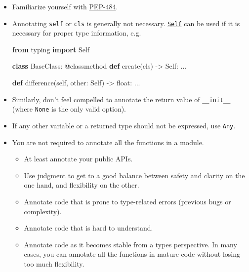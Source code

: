 \documentclass[
]{article}
\newenvironment{Shaded}{}{}
\newcommand{\AttributeTok}[1]{\textcolor[rgb]{0.49,0.56,0.16}{#1}}
\newcommand{\BuiltInTok}[1]{\textcolor[rgb]{0.00,0.50,0.00}{#1}}
\newcommand{\ImportTok}[1]{\textcolor[rgb]{0.00,0.50,0.00}{\textbf{#1}}}
\newcommand{\KeywordTok}[1]{\textcolor[rgb]{0.00,0.44,0.13}{\textbf{#1}}}
\newcommand{\NormalTok}[1]{#1}
\newcommand{\OperatorTok}[1]{\textcolor[rgb]{0.40,0.40,0.40}{#1}}
\newcommand{\VariableTok}[1]{\textcolor[rgb]{0.10,0.09,0.49}{#1}}
\providecommand{\tightlist}{%
  \setlength{\itemsep}{0pt}\setlength{\parskip}{0pt}}
\begin{document}
\begin{itemize}
\item
  Familiarize yourself with
  \href{https://peps.python.org/pep-0484/}{PEP-484}.
\item
  Annotating \texttt{self} or \texttt{cls} is generally not necessary.
  \href{https://docs.python.org/3/library/typing.html\#typing.Self}{\texttt{Self}}
  can be used if it is necessary for proper type information, e.g.

\begin{samepage}
  \begin{Shaded}
\begin{Highlighting}[]
\ImportTok{from}\NormalTok{ typing }\ImportTok{import}\NormalTok{ Self}

\KeywordTok{class}\NormalTok{ BaseClass:}
  \AttributeTok{@classmethod}
  \KeywordTok{def}\NormalTok{ create(cls) }\OperatorTok{{-}\textgreater{}}\NormalTok{ Self:}
\NormalTok{    ...}

  \KeywordTok{def}\NormalTok{ difference(}\VariableTok{self}\NormalTok{, other: Self) }\OperatorTok{{-}\textgreater{}} \BuiltInTok{float}\NormalTok{:}
\NormalTok{    ...}
\end{Highlighting}
\end{Shaded}
\end{samepage}
\item
  Similarly, don't feel compelled to annotate the return value of
  \texttt{\_\_init\_\_} (where \texttt{None} is the only valid option).
\item
  If any other variable or a returned type should not be expressed, use
  \texttt{Any}.
\item
  You are not required to annotate all the functions in a module.

  \begin{itemize}
  \tightlist
  \item
    At least annotate your public APIs.
  \item
    Use judgment to get to a good balance between safety and clarity on
    the one hand, and flexibility on the other.
  \item
    Annotate code that is prone to type-related errors (previous bugs or
    complexity).
  \item
    Annotate code that is hard to understand.
  \item
    Annotate code as it becomes stable from a types perspective. In many
    cases, you can annotate all the functions in mature code without
    losing too much flexibility.
  \end{itemize}
\end{itemize}
\end{document}
